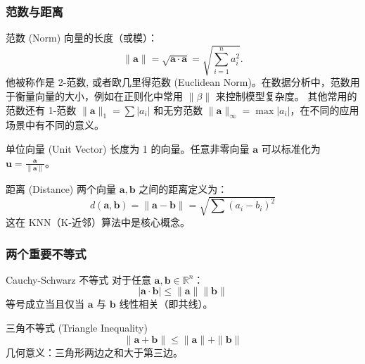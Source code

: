
\begin{frame}
\frametitle{范数与距离}

\begin{block}{范数 (Norm)}
向量的长度（或模）：
\[
\|\mathbf{a}\| = \sqrt{\mathbf{a} \cdot \mathbf{a}} = \sqrt{\sum_{i=1}^n a_i^2}.
\]
他被称作是 2-范数, 或者欧几里得范数 (Euclidean Norm)。在数据分析中，范数用于衡量向量的大小，例如在正则化中常用 $\|\beta\|$ 来控制模型复杂度。
其他常用的范数还有 1-范数 $\|\mathbf{a}\|_1 = \sum |a_i|$ 和无穷范数 $\|\mathbf{a}\|_\infty = \max |a_i|$，在不同的应用场景中有不同的意义。
\end{block}

\begin{block}{单位向量 (Unit Vector)}
长度为 1 的向量。任意非零向量 $\mathbf{a}$ 可以标准化为 $\mathbf{u} = \frac{\mathbf{a}}{\|\mathbf{a}\|}$。
\end{block}

\begin{block}{距离 (Distance)}
两个向量 $\mathbf{a}, \mathbf{b}$ 之间的距离定义为：
\[
d(\mathbf{a}, \mathbf{b}) = \|\mathbf{a} - \mathbf{b}\| = \sqrt{\sum (a_i - b_i)^2}
\]
这在 KNN（K-近邻）算法中是核心概念。
\end{block}

\end{frame}


\begin{frame}
\frametitle{两个重要不等式}

\begin{block}{Cauchy-Schwarz 不等式}
对于任意 $\mathbf{a}, \mathbf{b} \in \mathbb{R}^n$：
\[
|\mathbf{a} \cdot \mathbf{b}| \le \|\mathbf{a}\| \|\mathbf{b}\|
\]
等号成立当且仅当 $\mathbf{a}$ 与 $\mathbf{b}$ 线性相关（即共线）。
\end{block}

\pause

\begin{block}{三角不等式 (Triangle Inequality)}
\[
\|\mathbf{a} + \mathbf{b}\| \le \|\mathbf{a}\| + \|\mathbf{b}\|
\]
几何意义：三角形两边之和大于第三边。
\end{block}

\end{frame}


